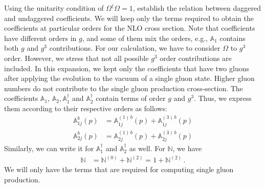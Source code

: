 \documentclass[aps,prd,amsmath,amssymb,nofootinbib]{revtex4-2}
\def\mf#1{\mathbb{#1}}
\numberwithin{equation}{section}
\begin{document}
Using the unitarity condition of $\Omega^{\dagger}\Omega = 1$, establish the relation between daggered and undaggered coefficients. We will keep only the terms required to obtain the coefficients at particular orders for the NLO cross section.
Note that coefficients have different orders in $g$, and some of them mix the orders, e.g., $\mf{A}_{1}$ contains both $g$ and $g^3$ contributions. For our calculation, we have to consider  $\Omega$ to $g^3$ order. However, we stress that not all possible $g^3$ order contributions are included. In this expansion, we kept only the coefficients that have two gluons after applying the evolution to the vacuum of a single gluon state. Higher gluon numbers do not contribute to the single gluon production cross-section. The coefficients $\mf{A}_{1}$, $\mf{A}_{2}, \mf{A}^{\dagger}_{1}$ and $\mf{A}^{\dagger}_{2}$ contain terms of order $g$ and $g^{3}$.  Thus, we express them according to their respective orders as follows:
\begin{align}
    \mf{A}^{b}_{1j}(p) &=  \mf{A}^{(1)\, b}_{1j}(p) +  \mf{A}^{(3)\, b}_{1j}(p)\\ 
    \mf{A}^{b}_{2j}(p) &=  \mf{A}^{(1)\, b}_{2j}(p) +  \mf{A}^{(3)\, b}_{2j}(p)
\end{align}
Similarly, we can write it for $\mf{A}^{\dagger}_{1}$ and $\mf{A}^{\dagger}_{2}$ as well.
For $\mf{N}$, we have 
\begin{align}
    \mf{N}  &=  \mf{N}^{(0)} +  \mf{N}^{(2)} = 1 +  \mf{N}^{(2)}\,. 
\end{align}
We will only have the terms that are required for computing single gluon production. 
\end{document}
